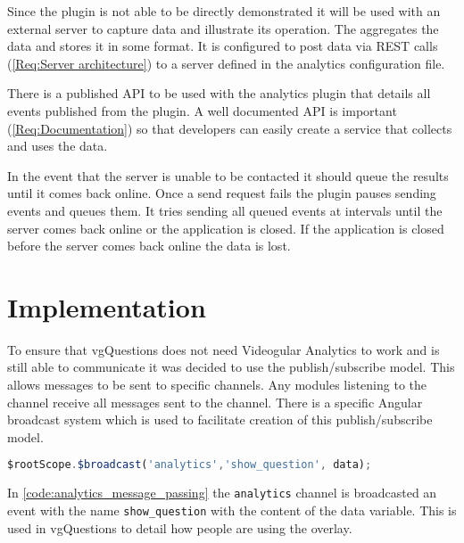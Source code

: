 Since the plugin is not able to be directly demonstrated it will be used with an external server to capture data and illustrate its operation. The aggregates the data and stores it in some format. It is configured to post data via \gls{REST} calls (\cref{Req:Server architecture}) to a server defined in the analytics configuration file.

There is a published \gls{API} to be used with the analytics plugin that details all events published from the plugin. A well documented API is important (\cref{Req:Documentation}) so that developers can easily create a service that collects and uses the data.

In the event that the server is unable to be contacted it should queue the results until it comes back online. Once a send request fails the plugin pauses sending events and queues them. It tries sending all queued events at intervals until the server comes back online or the application is closed. If the application is closed before the server comes back online the data is lost.

\section{Implementation}

To ensure that \gls{vgQuestions} does not need \gls{Videogular} Analytics to work and is still able to communicate it was decided to use the publish/subscribe model. This allows messages to be sent to specific channels. Any modules listening to the channel receive all messages sent to the channel. There is a specific Angular broadcast system which is used to facilitate creation of this publish/subscribe model.

\begin{lstlisting}[language=javascript,caption={AngularJS demonstrating the message passing interface used in the Analytics plugin},label={code:analytics_message_passing}]
$rootScope.$broadcast('analytics','show_question', data);
\end{lstlisting}

In \autoref{code:analytics_message_passing} the \lstinline|analytics| channel is broadcasted an event with the name
\lstinline|show_question| with the content of the data variable. This is used in \gls{vgQuestions} to detail how people are using the overlay.

